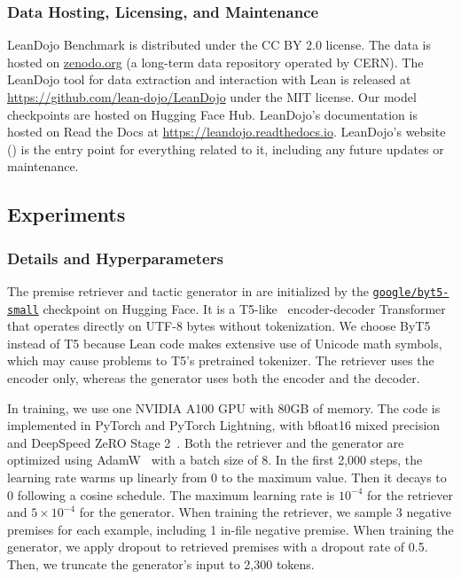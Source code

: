 \subsubsection{Data Hosting, Licensing, and Maintenance}
\label{appendix:hosting}

LeanDojo Benchmark is distributed under the CC BY 2.0 license. The data is hosted on \href{https://zenodo.org/}{zenodo.org} (a long-term data repository operated by CERN). The LeanDojo tool for data extraction and interaction with Lean is released at \url{https://github.com/lean-dojo/LeanDojo} 
under the MIT license. Our model checkpoints are hosted on Hugging Face Hub. LeanDojo's documentation is hosted on Read the Docs at \url{https://leandojo.readthedocs.io}. LeanDojo's website ({\weburl}) is the entry point for everything related to it, including any future updates or maintenance. 



\subsection{Experiments}

\subsubsection{Details and Hyperparameters}
\label{appendix:experimentaldetails}

The premise retriever and tactic generator in {\name} are initialized by the \href{https://huggingface.co/google/byt5-small}{\texttt{google/byt5-small}} checkpoint on Hugging Face. It is a T5-like~\cite{raffel2020exploring} encoder-decoder Transformer that operates directly on UTF-8 bytes without tokenization. We choose ByT5~\cite{xue2022byt5} instead of T5 because Lean code makes extensive use of Unicode math symbols, which may cause problems to T5's pretrained tokenizer. The retriever uses the encoder only, whereas the generator uses both the encoder and the decoder. 

In training, we use one NVIDIA A100 GPU with 80GB of memory. The code is implemented in PyTorch and PyTorch Lightning, with bfloat16 mixed precision and DeepSpeed ZeRO Stage 2~\cite{rasley2020deepspeed}. Both the retriever and the generator are optimized using AdamW~\cite{loshchilovdecoupled} with a batch size of 8. In the first 2,000 steps, the learning rate warms up linearly from 0 to the maximum value. Then it decays to 0 following a cosine schedule. The maximum learning rate is $10^{-4}$ for the retriever and $5 \times 10^{-4}$ for the generator. When training the retriever, we sample 3 negative premises for each example, including 1 in-file negative premise. When training the generator, we apply dropout to retrieved premises with a dropout rate of 0.5. Then, we truncate the generator's input to 2,300 tokens.

